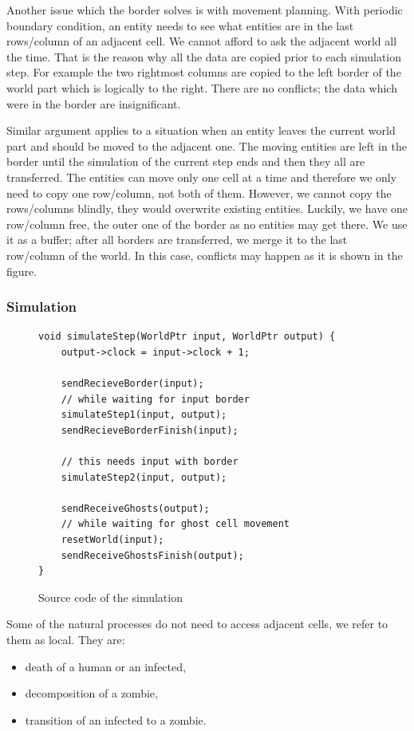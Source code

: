 \documentclass[a4paper]{article}
\begin{document}
Another issue which the border solves is with movement planning.
With periodic boundary condition, an entity needs to see what entities are in the last rows/column of an adjacent cell.
We cannot afford to ask the adjacent world all the time.
That is the reason why all the data are copied prior to each simulation step.
For example the two rightmost columns are copied to the left border of the world part which is logically to the right.
There are no conflicts; the data which were in the border are insignificant.

Similar argument applies to a situation when an entity leaves the current world part and should be moved to the adjacent one.
The moving entities are left in the border until the simulation of the current step ends and then they all are transferred.
The entities can move only one cell at a time and therefore we only need to copy one row/column, not both of them.
However, we cannot copy the rows/columns blindly, they would overwrite existing entities.
Luckily, we have one row/column free, the outer one of the border as no entities may get there.
We use it as a buffer; after all borders are transferred, we merge it to the last row/column of the world.
In this case, conflicts may happen as it is shown in the figure.

\subsubsection{Simulation}

\begin{figure}[ht]
    \centering
\begin{verbatim}
void simulateStep(WorldPtr input, WorldPtr output) {
    output->clock = input->clock + 1;

    sendRecieveBorder(input);
    // while waiting for input border
    simulateStep1(input, output);
    sendRecieveBorderFinish(input);

    // this needs input with border
    simulateStep2(input, output);

    sendReceiveGhosts(output);
    // while waiting for ghost cell movement
    resetWorld(input);
    sendReceiveGhostsFinish(output);
}
\end{verbatim}
    \caption{Source code of the simulation}
\end{figure}

Some of the natural processes do not need to access adjacent cells, we refer to them as local.
They are:
\begin{itemize}
\item death of a human or an infected,
\item decomposition of a zombie,
\item transition of an infected to a zombie.
\end{itemize}
\end{document}
